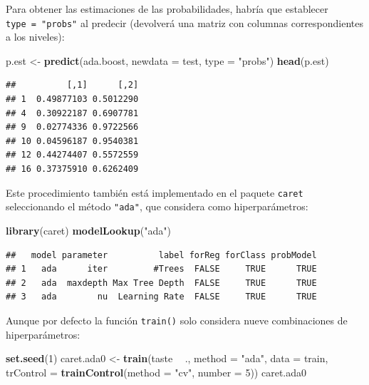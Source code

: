 \documentclass[
]{book}
\newenvironment{Shaded}{\begin{snugshade}}{\end{snugshade}}
\newcommand{\DataTypeTok}[1]{\textcolor[rgb]{0.13,0.29,0.53}{#1}}
\newcommand{\DecValTok}[1]{\textcolor[rgb]{0.00,0.00,0.81}{#1}}
\newcommand{\KeywordTok}[1]{\textcolor[rgb]{0.13,0.29,0.53}{\textbf{#1}}}
\newcommand{\NormalTok}[1]{#1}
\newcommand{\OperatorTok}[1]{\textcolor[rgb]{0.81,0.36,0.00}{\textbf{#1}}}
\newcommand{\StringTok}[1]{\textcolor[rgb]{0.31,0.60,0.02}{#1}}
\theoremstyle{break}
\theoremstyle{definition}
\theoremstyle{definition}
\theoremstyle{definition}
\theoremstyle{remark}
\begin{document}
Para obtener las estimaciones de las probabilidades, habría que establecer \texttt{type\ =\ "probs"} al predecir (devolverá una matriz con columnas correspondientes a los niveles):

\begin{Shaded}
\begin{Highlighting}[]
\NormalTok{p.est <-}\StringTok{ }\KeywordTok{predict}\NormalTok{(ada.boost, }\DataTypeTok{newdata =}\NormalTok{ test, }\DataTypeTok{type =} \StringTok{"probs"}\NormalTok{)}
\KeywordTok{head}\NormalTok{(p.est)}
\end{Highlighting}
\end{Shaded}

\begin{verbatim}
##          [,1]      [,2]
## 1  0.49877103 0.5012290
## 4  0.30922187 0.6907781
## 9  0.02774336 0.9722566
## 10 0.04596187 0.9540381
## 12 0.44274407 0.5572559
## 16 0.37375910 0.6262409
\end{verbatim}

Este procedimiento también está implementado en el paquete \texttt{caret} seleccionando el método \texttt{"ada"}, que considera como hiperparámetros:

\begin{Shaded}
\begin{Highlighting}[]
\KeywordTok{library}\NormalTok{(caret)}
\KeywordTok{modelLookup}\NormalTok{(}\StringTok{"ada"}\NormalTok{)}
\end{Highlighting}
\end{Shaded}

\begin{verbatim}
##   model parameter          label forReg forClass probModel
## 1   ada      iter         #Trees  FALSE     TRUE      TRUE
## 2   ada  maxdepth Max Tree Depth  FALSE     TRUE      TRUE
## 3   ada        nu  Learning Rate  FALSE     TRUE      TRUE
\end{verbatim}

Aunque por defecto la función \texttt{train()} solo considera nueve combinaciones de hiperparámetros:

\begin{Shaded}
\begin{Highlighting}[]
\KeywordTok{set.seed}\NormalTok{(}\DecValTok{1}\NormalTok{)}
\NormalTok{caret.ada0 <-}\StringTok{ }\KeywordTok{train}\NormalTok{(taste }\OperatorTok{~}\StringTok{ }\NormalTok{., }\DataTypeTok{method =} \StringTok{"ada"}\NormalTok{, }\DataTypeTok{data =}\NormalTok{ train,}
                   \DataTypeTok{trControl =} \KeywordTok{trainControl}\NormalTok{(}\DataTypeTok{method =} \StringTok{"cv"}\NormalTok{, }\DataTypeTok{number =} \DecValTok{5}\NormalTok{))}
\NormalTok{caret.ada0}
\end{Highlighting}
\end{Shaded}
\end{document}
